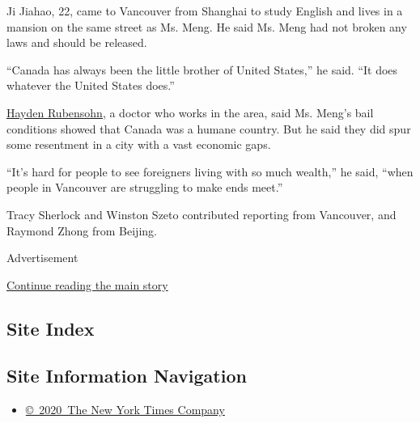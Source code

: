 Ji Jiahao, 22, came to Vancouver from Shanghai to study English and
lives in a mansion on the same street as Ms. Meng. He said Ms. Meng had
not broken any laws and should be released.

``Canada has always been the little brother of United States,'' he said.
``It does whatever the United States does.''

\href{https://residentdoctorsbc.ca/resident-spotlight-dr-hayden-rubensohn/}{Hayden
Rubensohn}, a doctor who works in the area, said Ms. Meng's bail
conditions showed that Canada was a humane country. But he said they did
spur some resentment in a city with a vast economic gaps.

``It's hard for people to see foreigners living with so much wealth,''
he said, ``when people in Vancouver are struggling to make ends meet.''

Tracy Sherlock and Winston Szeto contributed reporting from Vancouver,
and Raymond Zhong from Beijing.

Advertisement

\protect\hyperlink{after-bottom}{Continue reading the main story}

\hypertarget{site-index}{%
\subsection{Site Index}\label{site-index}}

\hypertarget{site-information-navigation}{%
\subsection{Site Information
Navigation}\label{site-information-navigation}}

\begin{itemize}
\tightlist
\item
  \href{https://help.nytimes.com/hc/en-us/articles/115014792127-Copyright-notice}{©~2020~The
  New York Times Company}
\end{itemize}

